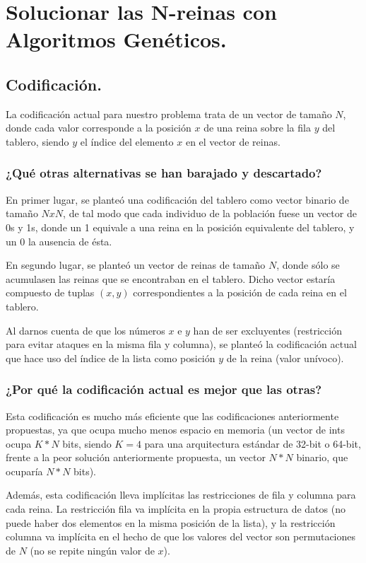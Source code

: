 \documentclass[12pt]{article}
\begin{document}
\newpage
\section{Solucionar las N-reinas con Algoritmos Genéticos.}

\subsection{Codificación.}

La codificación actual para nuestro problema trata de un vector de tamaño $N$, donde cada valor corresponde a la posición $x$ de una reina sobre la fila $y$ del tablero, siendo $y$ el índice del elemento $x$ en el vector de reinas.

\subsubsection{¿Qué otras alternativas se han barajado y descartado?}

En primer lugar, se planteó una codificación del tablero como vector binario de tamaño $NxN$, de tal modo que cada individuo de la población fuese un vector de 0s y 1s, donde un 1 equivale a una reina en la posición equivalente del tablero, y un 0 la ausencia de ésta.

En segundo lugar, se planteó un vector de reinas de tamaño $N$, donde sólo se acumulasen las reinas que se encontraban en el tablero. Dicho vector estaría compuesto de tuplas $(x,y)$ correspondientes a la posición de cada reina en el tablero.

Al darnos cuenta de que los números $x$ e $y$ han de ser excluyentes (restricción para evitar ataques en la misma fila y columna), se planteó la codificación actual que hace uso del índice de la lista como posición $y$ de la reina (valor unívoco).

\subsubsection{¿Por qué la codificación actual es mejor que las otras?}

Esta codificación es mucho más eficiente que las codificaciones anteriormente propuestas, ya que ocupa mucho menos espacio en memoria (un vector de ints ocupa $K*N$ bits, siendo $K=4$ para una arquitectura estándar de 32-bit o 64-bit, frente a la peor solución anteriormente propuesta, un vector $N*N$ binario, que ocuparía $N*N$ bits).

Además, esta codificación lleva implícitas las restricciones de fila y columna para cada reina. La restricción fila va implícita en la propia estructura de datos (no puede haber dos elementos en la misma posición de la lista), y la restricción columna va implícita en el hecho de que los valores del vector son permutaciones de $N$ (no se repite ningún valor de $x$).
\end{document}
